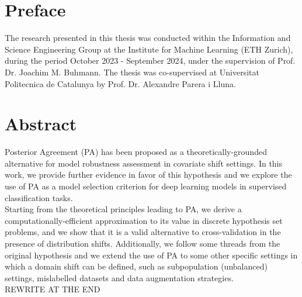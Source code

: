 
\chapter*{Preface}

The research presented in this thesis was conducted within the Information and Science Engineering Group at the Institute for Machine Learning (ETH Zurich), during the period October 2023 - September 2024, under
the supervision of Prof. Dr. Joachim M. Buhmann. The thesis was co-supervised at Universitat Politecnica de Catalunya by Prof. Dr. Alexandre Parera i Lluna.

 \cleardoublepage


 \setcounter{tocdepth}{2}
 \tableofcontents

 \cleardoublepage


\chapter*{Abstract}

 Posterior Agreement (PA) has been proposed as a theoretically-grounded alternative for model
 robustness assessment in covariate shift settings. In this work, we provide further evidence in favor of
 this hypothesis and we explore the use of PA as a model selection criterion for deep learning models in supervised 
 classification tasks. \\
 
 Starting from the theoretical principles leading to PA, we derive a computationally-efficient approximation to its value in 
 discrete hypothesis set problems, and we show that it is a valid alternative to cross-validation in the presence of distribution shifts. Additionally, we follow some threads from the original hypothesis and we extend the use of PA to some other specific settings 
 in which a domain shift can be defined, such as subpopulation (unbalanced) settings, mislabelled datasets and data augmentation strategies. \\

 REWRITE AT THE END
 \cleardoublepage



